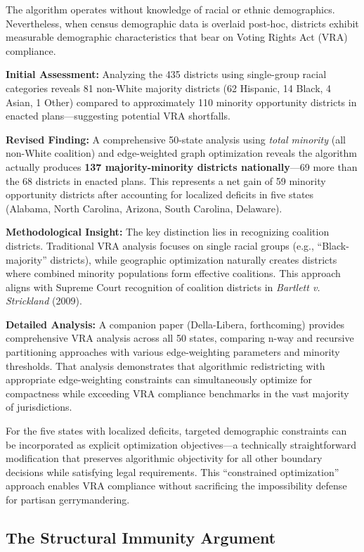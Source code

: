 The algorithm operates without knowledge of racial or ethnic demographics. Nevertheless, when census demographic data is overlaid post-hoc, districts exhibit measurable demographic characteristics that bear on Voting Rights Act (VRA) compliance.

\textbf{Initial Assessment:} Analyzing the 435 districts using single-group racial categories reveals 81 non-White majority districts (62 Hispanic, 14 Black, 4 Asian, 1 Other) compared to approximately 110 minority opportunity districts in enacted plans—suggesting potential VRA shortfalls.

\textbf{Revised Finding:} A comprehensive 50-state analysis using \textit{total minority} (all non-White coalition) and edge-weighted graph optimization reveals the algorithm actually produces \textbf{137 majority-minority districts nationally}—69 more than the 68 districts in enacted plans. This represents a net gain of 59 minority opportunity districts after accounting for localized deficits in five states (Alabama, North Carolina, Arizona, South Carolina, Delaware).

\textbf{Methodological Insight:} The key distinction lies in recognizing coalition districts. Traditional VRA analysis focuses on single racial groups (e.g., ``Black-majority'' districts), while geographic optimization naturally creates districts where combined minority populations form effective coalitions. This approach aligns with Supreme Court recognition of coalition districts in \textit{Bartlett v. Strickland} (2009).

\textbf{Detailed Analysis:} A companion paper (Della-Libera, forthcoming) provides comprehensive VRA analysis across all 50 states, comparing n-way and recursive partitioning approaches with various edge-weighting parameters and minority thresholds. That analysis demonstrates that algorithmic redistricting with appropriate edge-weighting constraints can simultaneously optimize for compactness while exceeding VRA compliance benchmarks in the vast majority of jurisdictions.

For the five states with localized deficits, targeted demographic constraints can be incorporated as explicit optimization objectives—a technically straightforward modification that preserves algorithmic objectivity for all other boundary decisions while satisfying legal requirements. This ``constrained optimization'' approach enables VRA compliance without sacrificing the impossibility defense for partisan gerrymandering.

\subsection{The Structural Immunity Argument}

